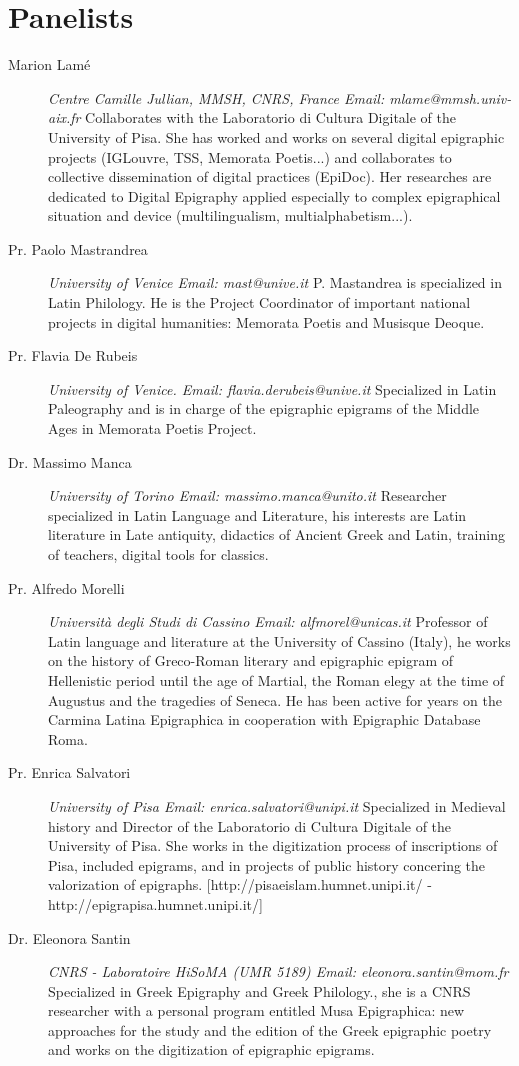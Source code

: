 \documentclass[amsthm,ebook]{saparticle}
\begin{document}
\section{Panelists}
\begin{description}
\item[Marion Lamé]\emph{Centre Camille Jullian, MMSH, CNRS, France Email: mlame@mmsh.univ-aix.fr} Collaborates with the Laboratorio di Cultura Digitale of the University of Pisa. She has worked and works on several digital epigraphic projects (IGLouvre, TSS, Memorata Poetis...) and collaborates to collective dissemination of digital practices (EpiDoc). Her researches are dedicated to Digital Epigraphy applied especially to complex epigraphical situation and device (multilingualism, multialphabetism...).

\item[Pr. Paolo Mastrandrea] \emph{University of Venice Email: mast@unive.it}
P. Mastandrea is specialized in Latin Philology. He is the Project Coordinator of important national projects in digital humanities: Memorata Poetis and Musisque Deoque.


\item[Pr. Flavia De Rubeis] \emph{University of Venice.
Email: flavia.derubeis@unive.it} Specialized in Latin Paleography and is in charge of the epigraphic epigrams of the Middle Ages in Memorata Poetis Project.

\item[Dr. Massimo Manca] \emph{University of Torino
Email: massimo.manca@unito.it} Researcher specialized in Latin Language and Literature, his interests are Latin literature in Late antiquity, didactics of Ancient Greek and Latin, training of teachers, digital tools 
for classics.

\item[Pr. Alfredo Morelli] \emph{Università degli Studi di Cassino Email: alfmorel@unicas.it} Professor of Latin language and literature at the University of Cassino (Italy), he works on the history of Greco-Roman literary and epigraphic epigram of Hellenistic period until the age of Martial, the Roman elegy at the time of Augustus and the tragedies of Seneca. He has been active for years on the Carmina Latina Epigraphica in cooperation with Epigraphic Database Roma.

\item[Pr. Enrica Salvatori] \emph{University of Pisa
Email: enrica.salvatori@unipi.it} Specialized in Medieval history and Director of the Laboratorio di Cultura Digitale of the University of Pisa. She works in the digitization process of inscriptions of Pisa, included epigrams, and in projects of public history concering the valorization of epigraphs.
[http://pisaeislam.humnet.unipi.it/ - http://epigrapisa.humnet.unipi.it/]

\item[Dr. Eleonora Santin] \emph{CNRS - Laboratoire HiSoMA (UMR 5189) Email: eleonora.santin@mom.fr} Specialized in Greek Epigraphy and Greek Philology., she is a CNRS researcher with a personal program entitled Musa Epigraphica: new approaches for the study and the edition of the Greek epigraphic poetry and works on the digitization of epigraphic epigrams.


\end{description}
\end{document}
